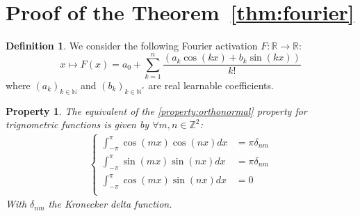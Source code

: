 \documentclass{article} %
\theoremstyle{plain}
\newtheorem{property}[theorem]{Property}
\theoremstyle{definition}
\newtheorem{definition}[theorem]{Definition}
\theoremstyle{remark}
\begin{document}
\section{Proof of the Theorem~\ref{thm:fourier}}
\label{appendix:fourier}
\begin{definition}
\label{def:fourier}
We consider the following Fourier activation $F \colon  \mathbb{R} \to \mathbb{R}$:
\begin{equation}
\label{eq:fourier_appendix}
    x \mapsto F(x) = a_0 +
    \sum_{k=1}^{n} \frac{\left(a_k \cos(k x) + b_k \sin(k x)\right)}{k!}
\end{equation}
where \( (a_k)_{k \in \mathbb{N}} \) and \( (b_k)_{k \in \mathbb{N}^*} \) are real learnable coefficients.
\end{definition}
\begin{property}
\label{property:fourier_ortho}
The equivalent of the \ref{property:orthonormal} property for trignometric functions is given by $\forall m,n \in \mathbb{Z}^2$:
\begin{align}
\left\{\begin{aligned}
    \int_{-\pi}^{\pi} \cos(m x) \cos(n x)  d x&=\pi\delta_{n m}\\
    \int_{-\pi}^{\pi} \sin(m x) \sin(n x)  d x&=\pi\delta_{n m}\\
    \int_{-\pi}^{\pi} \cos(m x) \sin(n x)  d x&=0\\
\end{aligned}\right.
\end{align}
With $\delta_{nm}$ the Kronecker delta function.
\end{property} 
\end{document}
